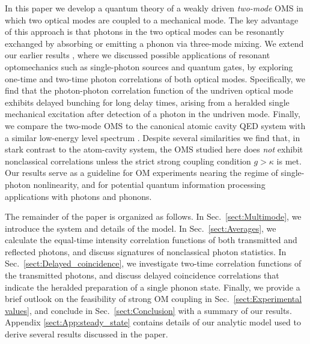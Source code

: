 In this paper we develop a quantum theory of a weakly driven
\emph{two-mode} OMS
\cite{Miao2009, Stannigel2012,Ludwig2012, BasiriEsfahani2012} 
in which two optical modes are coupled to
a mechanical mode. 
The key advantage of this approach is that
 photons in the two optical modes can be resonantly exchanged by absorbing or
 emitting a phonon via three-mode mixing.
 We extend our earlier results \cite{Stannigel2012}, where we discussed possible
 applications of resonant optomechanics such as single-photon sources and
 quantum gates,
 by exploring one-time and two-time photon correlations 
 of both optical modes.
 Specifically, we find that the photon-photon correlation function of the
 undriven optical mode exhibits delayed bunching for long delay times,
 arising from a heralded single mechanical excitation after detection of a
 photon in the undriven mode.
 Finally, we compare the two-mode OMS
 to the canonical atomic cavity QED system with 
 a similar low-energy level spectrum
 \cite{Carmichael1991, Brecha1999}.
 Despite several similarities we find that, 
 in stark contrast to the atom-cavity system, the OMS studied
 here does {\it not} exhibit nonclassical
 correlations unless the strict strong coupling condition $g >
 \kappa$ is met.
Our results serve as a guideline for OM experiments 
nearing the regime of 
single-photon nonlinearity, and for
potential quantum information processing applications
with photons and phonons.



The remainder of the paper is organized as follows. 
In
Sec.~\ref{sect:Multimode}, we introduce the system and details of the model.
In Sec.~\ref{sect:Averages}, we calculate the equal-time intensity correlation
functions of both  transmitted and  reflected photons, and discuss
signatures of nonclassical photon statistics.
In Sec.~\ref{sect:Delayed_coincidence}, 
we investigate two-time correlation functions
of the transmitted photons, and discuss delayed
coincidence correlations that indicate the heralded
preparation of a single phonon state.
Finally, we provide
a brief outlook on the feasibility of strong OM coupling 
in Sec.~\ref{sect:Experimental values}, 
and 
conclude
in Sec.~\ref{sect:Conclusion} with a summary of our
results.
Appendix \ref{sect:App:steady_state} contains details of our analytic model used to
derive several results discussed in the paper.



